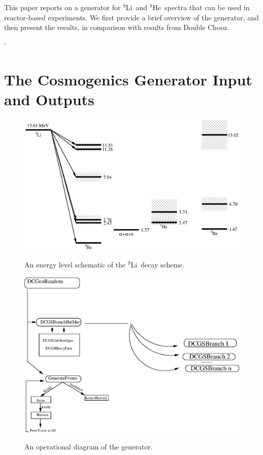 \documentclass{JINST}
\newcommand{\li}{$^{9}$Li~}
\newcommand{\he}{$^{8}$He~}
\begin{document}
     This paper reports on a generator for \li and \he spectra that
     can be used in reactor-based experiments.   We first provide a
     brief overview of the generator, and then present the results, in
     comparison with results from Double Chooz.  
      
`
\section{The Cosmogenics Generator Input and Outputs}
\label{section1}

 \begin{figure}[t]
  \includegraphics[scale=0.65]{Lithium9DecayScheme.eps}
  \label{DecayScheme}
  \caption{An energy level schematic of the \li decay scheme. }
 \end{figure}


 \begin{figure}[t]
 \begin{center}
  \includegraphics[scale=0.65]{tmp_xfig.eps}
  \label{OperDiagram}
  \caption{An operational diagram of the generator. }
    \end{center}
 \end{figure}
\end{document}
